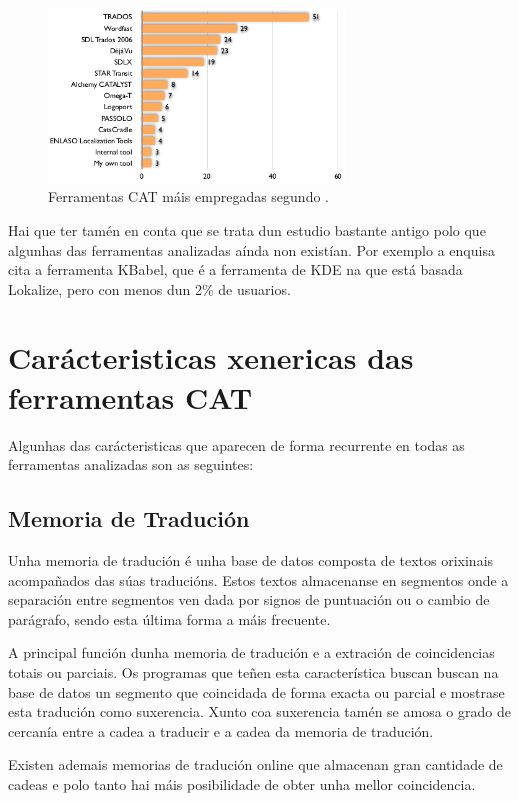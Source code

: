 \begin{figure}[h]
    \centering
    \includegraphics[width=0.7\textwidth]{img/grafico_uso_cat_enquisa2006.png}
    \caption{Ferramentas CAT máis empregadas segundo \cite{article:2006survey}.}
    \label{fig:enquisa2006}
\end{figure}

Hai que ter tamén en conta que se trata dun estudio bastante antigo polo que algunhas das ferramentas analizadas aínda non existían. Por exemplo a enquisa cita a ferramenta KBabel, que é a ferramenta de KDE na que está basada Lokalize, pero con menos dun 2\% de usuarios.


\section{Carácteristicas xenericas das ferramentas CAT}

Algunhas das carácteristicas que aparecen de forma recurrente en todas as ferramentas analizadas son as seguintes:

\subsection{Memoria de Tradución}
Unha memoria de tradución é unha base de datos composta de textos orixinais acompañados das súas traducións. Estos textos almacenanse en segmentos onde a separación entre segmentos ven dada por signos de puntuación ou o cambio de parágrafo, sendo esta última forma a máis frecuente.

A principal función dunha memoria de tradución e a extración de coincidencias totais ou parciais. Os programas que teñen esta característica buscan buscan na base de datos un segmento que coincidada de forma exacta ou parcial e mostrase esta tradución como suxerencia. Xunto coa suxerencia tamén se amosa o grado de cercanía entre a cadea a traducir e a cadea da memoria de tradución.

Existen ademais memorias de tradución online que almacenan gran cantidade de cadeas e polo tanto hai máis posibilidade de obter unha mellor coincidencia.

